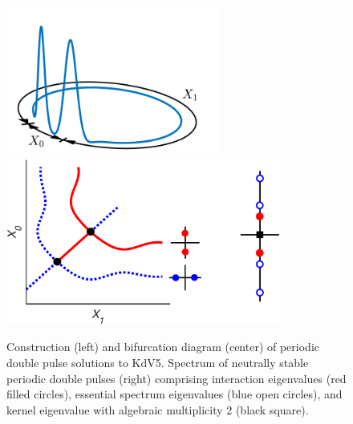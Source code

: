 \documentclass[12pt,reqno,oneside,hidelinks]{article}
\begin{document}
\begin{figure}
    \begin{center}
    \includegraphics[width=7cm]{images/2pulse3d.png} \hspace{-1cm}
    \includegraphics[width=9cm]{images/2pitchforkcoloreig2.eps}
    \end{center}
    \caption{Construction (left) and bifurcation diagram (center) of periodic double pulse solutions to KdV5. Spectrum of neutrally stable periodic double pulses (right) comprising interaction eigenvalues (red filled circles), essential spectrum eigenvalues (blue open circles), and kernel eigenvalue with algebraic multiplicity 2 (black square).}
    \label{fig:periodic}
\end{figure}
    
\end{document}
